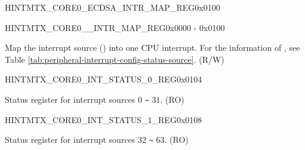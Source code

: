 \begin{register}{H}{INTMTX\_CORE0\_ECDSA\_INTR\_MAP\_REG}{0x0100}\label{regdesc:INTMTXCORE0ECDSAINTRMAPREG}
\end{register}\vspace{-3em}

\begin{register}{H}{INTMTX\_CORE0\_\_INTR\_MAP\_REG}{0x0000 - 0x0100}\label{INTMTXCORE0SOURCEINTRMAPREG}
%
%
\regnewline%
\begin{regdesc}\begin{reglist}
\label{INTMTXCORE0SOURCEINTRMAP}\item [INTMTX\_CORE0\_\regindex{SOURCE}\_INTR\_MAP] Map the interrupt source () into one CPU interrupt. For the information of , see Table \ref{tab:peripheral-interrupt-config-status-source}. (R/W)
\end{reglist}\end{regdesc}
\end{register}

\begin{register}{H}{INTMTX\_CORE0\_INT\_STATUS\_0\_REG}{0x0104}\label{regdesc:INTMTXCORE0INTSTATUS0REG}
%
\regnewline%
\begin{regdesc}\begin{reglist}
\label{fielddesc:INTMTXCORE0INTSTATUS0}\item [INTMTX\_CORE0\_INT\_STATUS\_0] Status register for interrupt sources 0 \verb+~+ 31. (RO)
\end{reglist}\end{regdesc}
\end{register}


\begin{register}{H}{INTMTX\_CORE0\_INT\_STATUS\_1\_REG}{0x0108}\label{regdesc:INTMTXCORE0INTSTATUS1REG}
%
\regnewline%
\begin{regdesc}\begin{reglist}
\label{fielddesc:INTMTXCORE0INTSTATUS1}\item [INTMTX\_CORE0\_INT\_STATUS\_1] Status register for interrupt sources 32 \verb+~+ 63. (RO)
\end{reglist}\end{regdesc}
\end{register}


